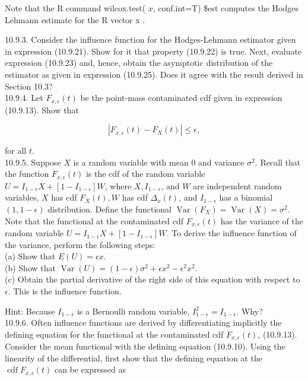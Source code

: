Note that the R command wilcox.test( $x$, conf.int=T) \$est computes the Hodges Lehmann estimate for the R vector x .

10.9.3. Consider the influence function for the Hodges-Lehmann estimator given in expression (10.9.21). Show for it that property (10.9.22) is true. Next, evaluate expression (10.9.23) and, hence, obtain the asymptotic distribution of the estimator as given in expression (10.9.25). Does it agree with the result derived in Section 10.3?\\
10.9.4. Let $F_{x, \epsilon}(t)$ be the point-mass contaminated cdf given in expression (10.9.13). Show that

$$
\left|F_{x, \epsilon}(t)-F_{X}(t)\right| \leq \epsilon,
$$

for all $t$.\\
10.9.5. Suppose $X$ is a random variable with mean 0 and variance $\sigma^{2}$. Recall that the function $F_{x, \epsilon}(t)$ is the cdf of the random variable $U=I_{1-\epsilon} X+\left[1-I_{1-\epsilon}\right] W$, where $X, I_{1-\epsilon}$, and $W$ are independent random variables, $X$ has cdf $F_{X}(t), W$ has cdf $\Delta_{x}(t)$, and $I_{1-\epsilon}$ has a binomial $(1,1-\epsilon)$ distribution. Define the functional $\operatorname{Var}\left(F_{X}\right)=\operatorname{Var}(X)=\sigma^{2}$. Note that the functional at the contaminated cdf $F_{x, \epsilon}(t)$ has the variance of the random variable $U=I_{1-\epsilon} X+\left[1-I_{1-\epsilon}\right] W$. To derive the influence function of the variance, perform the following steps:\\
(a) Show that $E(U)=\epsilon x$.\\
(b) Show that $\operatorname{Var}(U)=(1-\epsilon) \sigma^{2}+\epsilon x^{2}-\epsilon^{2} x^{2}$.\\
(c) Obtain the partial derivative of the right side of this equation with respect to $\epsilon$. This is the influence function.

Hint: Because $I_{1-\epsilon}$ is a Bernoulli random variable, $I_{1-\epsilon}^{2}=I_{1-\epsilon}$. Why?\\
10.9.6. Often influence functions are derived by differentiating implicitly the defining equation for the functional at the contaminated cdf $F_{x, \epsilon}(t)$, (10.9.13). Consider the mean functional with the defining equation (10.9.10). Using the linearity of the differential, first show that the defining equation at the $\operatorname{cdf} F_{x, \epsilon}(t)$ can be expressed as


